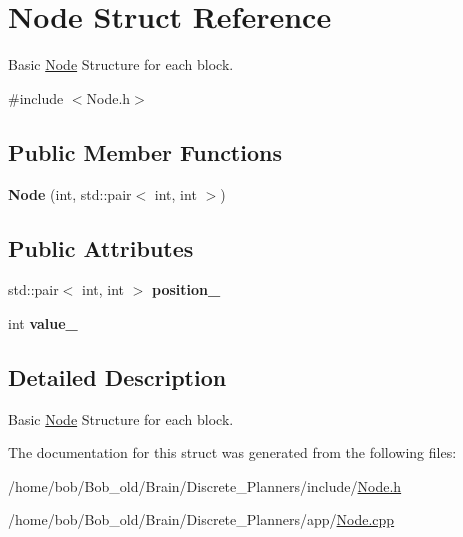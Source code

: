 \hypertarget{structNode}{}\section{Node Struct Reference}
\label{structNode}


Basic \hyperlink{structNode}{Node} Structure for each block.  




{\ttfamily \#include $<$Node.\+h$>$}

\subsection*{Public Member Functions}
\begin{DoxyCompactItemize}
\item 
{\bfseries Node} (int, std\+::pair$<$ int, int $>$)\hypertarget{structNode_a52f3b09372a1fe38e7749ee7f2c31e6f}{}\label{structNode_a52f3b09372a1fe38e7749ee7f2c31e6f}

\end{DoxyCompactItemize}
\subsection*{Public Attributes}
\begin{DoxyCompactItemize}
\item 
std\+::pair$<$ int, int $>$ {\bfseries position\+\_\+}\hypertarget{structNode_a50df561df296192769e0a2d1bd60e46b}{}\label{structNode_a50df561df296192769e0a2d1bd60e46b}

\item 
int {\bfseries value\+\_\+}\hypertarget{structNode_a294fa286e0cfcd8b3095ac1b168617d9}{}\label{structNode_a294fa286e0cfcd8b3095ac1b168617d9}

\end{DoxyCompactItemize}


\subsection{Detailed Description}
Basic \hyperlink{structNode}{Node} Structure for each block. 

The documentation for this struct was generated from the following files\+:\begin{DoxyCompactItemize}
\item 
/home/bob/\+Bob\+\_\+old/\+Brain/\+Discrete\+\_\+\+Planners/include/\hyperlink{Node_8h}{Node.\+h}\item 
/home/bob/\+Bob\+\_\+old/\+Brain/\+Discrete\+\_\+\+Planners/app/\hyperlink{Node_8cpp}{Node.\+cpp}\end{DoxyCompactItemize}

